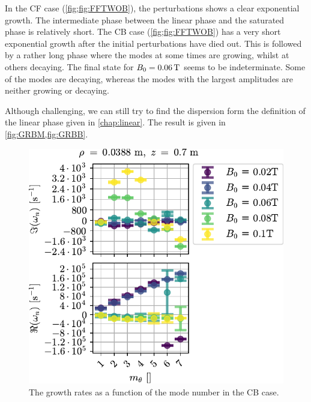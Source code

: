 %
In the CF case (\cref{fig;fig:FFTWOB}), the perturbations shows a clear exponential growth.
The intermediate phase between the linear phase and the saturated phase is relatively short.
The CB case (\cref{fig;fig:FFTWOB}) has a very short exponential growth after the initial perturbations have died out.
This is followed by a rather long phase where the modes at some times are growing, whilst at others decaying.
The final state for $B_0=0.06\, \text{T}$ seems to be indeterminate.
Some of the modes are decaying, whereas the modes with the largest amplitudes are neither growing or decaying.

Although challenging, we can still try to find the dispersion form the definition of the linear phase given in \cref{chap:linear}.
The result is given in \cref{fig:GRBM,fig:GRBB}.
%
\begin{figure}[htb]
    \centering
    \includegraphics{fig/results/compareBouss/growthRatesB0Bous}
    \caption{The growth rates as a function of the mode number in the CB case.}
    \label{fig:GRBM}
\end{figure}
%
